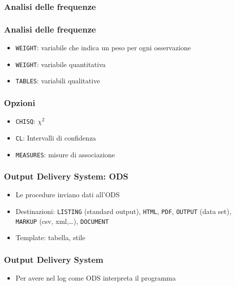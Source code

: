 \begin{frame}[containsverbatim]\frametitle{Analisi delle frequenze}
\end{frame}

\begin{frame}[containsverbatim]\frametitle{Analisi delle frequenze}
  \begin{itemize}
  \item
    \verb+WEIGHT+: variabile che indica un peso per ogni osservazione
  \item
    \verb+WEIGHT+: variabile quantitativa
  \item
    \verb+TABLES+: variabili qualitative
  \end{itemize}
\end{frame}


\begin{frame}[containsverbatim]\frametitle{Opzioni}
  \begin{itemize}
  \item
    \verb+CHISQ+: $\chi^2$
  \item
    \verb+CL+: Intervalli di confidenza
  \item
    \verb+MEASURES+: misure di associazione
  \end{itemize}
\end{frame}




\begin{frame}[containsverbatim]\frametitle{Output Delivery System: ODS}
  \begin{itemize}
  \item
    Le procedure inviano dati all'ODS
  \item
    Destinazioni: \verb+LISTING+ (standard output), \verb+HTML+, \verb+PDF+,
    \verb+OUTPUT+ (data set), \verb+MARKUP+ (csv, xml,\ldots), \verb+DOCUMENT+
  \item
    Template: tabella, stile
  \end{itemize}
\end{frame}


\begin{frame}[containsverbatim]\frametitle{Output Delivery System}
  \begin{itemize}
  \item
    Per avere nel log come ODS interpreta il programma
  \end{itemize}
\end{frame}


